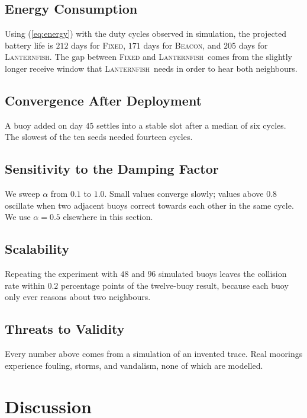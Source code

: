 \documentclass[conference]{IEEEtran}
\newcommand{\sysname}{\textsc{Lanternfish}}
\begin{document}
\subsection{Energy Consumption}
\label{sec:eval-energy}

Using (\ref{eq:energy}) with the duty cycles observed in simulation, the
projected battery life is $212$ days for \textsc{Fixed}, $171$ days for
\textsc{Beacon}, and $205$ days for \sysname. The gap between \textsc{Fixed}
and \sysname\ comes from the slightly longer receive window that \sysname\
needs in order to hear both neighbours.

\subsection{Convergence After Deployment}
\label{sec:eval-converge}

A buoy added on day $45$ settles into a stable slot after a median of six
cycles. The slowest of the ten seeds needed fourteen cycles.

\subsection{Sensitivity to the Damping Factor}
\label{sec:eval-alpha}

We sweep $\alpha$ from $0.1$ to $1.0$. Small values converge slowly; values
above $0.8$ oscillate when two adjacent buoys correct towards each other in
the same cycle. We use $\alpha = 0.5$ elsewhere in this section.

\subsection{Scalability}
\label{sec:eval-scale}

Repeating the experiment with $48$ and $96$ simulated buoys leaves the
collision rate within $0.2$ percentage points of the twelve-buoy result, because
each buoy only ever reasons about two neighbours.

\subsection*{Threats to Validity}

Every number above comes from a simulation of an invented trace. Real moorings
experience fouling, storms, and vandalism, none of which are modelled.

\section{Discussion}
\label{sec:discussion}
\end{document}
